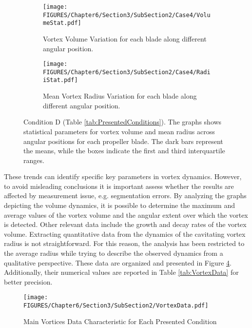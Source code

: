 \begin{figure}[p]
    \centering
    \begin{subfigure}[b]{\textwidth}
        \centering
        \texttt{[image: FIGURES/Chapter6/Section3/SubSection2/Case4/VolumeStat.pdf]}
        \caption{Vortex Volume Variation for each blade along different angular position.}
        \label{fig:VolumeCase4}
    \end{subfigure}
    
    \vfill
    
    \begin{subfigure}[b]{\textwidth}
        \centering
        \texttt{[image: FIGURES/Chapter6/Section3/SubSection2/Case4/RadiiStat.pdf]}
        \caption{Mean Vortex Radius Variation for each blade along different angular position.}
        \label{fig:RadiiCase4}
    \end{subfigure}
    \label{fig:Case4}
    \caption{Condition D (Table \ref{tab:PresentedConditions}). The graphs shows statistical parameters for vortex volume and mean radius across angular positions for each propeller blade. The dark bars represent the means, while the boxes indicate the first and third interquartile ranges.}
\end{figure}

These trends can identify specific key parameters in vortex dynamics. However, to avoid misleading conclusions it is important assess whether the results are affected by measurement issue, e.g. segmentation errors.
By analyzing the graphs depicting the volume dynamics, it is possible to determine the maximum and average values of the vortex volume and the angular extent over which the vortex is detected. Other relevant data include the growth and decay rates of the vortex volume.
Extracting quantitative data from the dynamics of the cavitating vortex radius is not straightforward. For this reason, the analysis has been restricted to the average radius while trying to describe the observed dynamics from a qualitative perspective.
These data are organized and presented in Figure \ref{fig:VortexData}. Additionally, their numerical values are reported in Table \ref{tab:VortexData} for better precision.

\begin{figure}[h] 
    \centering
    \texttt{[image: FIGURES/Chapter6/Section3/SubSection2/VortexData.pdf]}
    \caption{Main Vortices Data Characteristic for Each Presented Condition}
    \label{fig:VortexData}
\end{figure}

